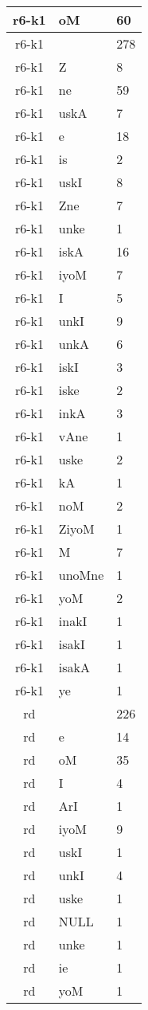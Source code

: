 \documentclass[a4 paper]{article}
\begin{document}
\begin{longtable}{cp{}p{}}
r6-k1 & oM & 60\\ \midrule r6-k1 &  & 278\\ \midrule r6-k1 & Z & 8\\ \midrule r6-k1 & ne & 59\\ \midrule r6-k1 & uskA & 7\\ \midrule r6-k1 & e & 18\\ \midrule r6-k1 & is & 2\\ \midrule r6-k1 & uskI & 8\\ \midrule r6-k1 & Zne & 7\\ \midrule r6-k1 & unke & 1\\ \midrule r6-k1 & iskA & 16\\ \midrule r6-k1 & iyoM & 7\\ \midrule r6-k1 & I & 5\\ \midrule r6-k1 & unkI & 9\\ \midrule r6-k1 & unkA & 6\\ \midrule r6-k1 & iskI & 3\\ \midrule r6-k1 & iske & 2\\ \midrule r6-k1 & inkA & 3\\ \midrule r6-k1 & vAne & 1\\ \midrule r6-k1 & uske & 2\\ \midrule r6-k1 & kA & 1\\ \midrule r6-k1 & noM & 2\\ \midrule r6-k1 & ZiyoM & 1\\ \midrule r6-k1 & M & 7\\ \midrule r6-k1 & unoMne & 1\\ \midrule r6-k1 & yoM & 2\\ \midrule r6-k1 & inakI & 1\\ \midrule r6-k1 & isakI & 1\\ \midrule r6-k1 & isakA & 1\\ \midrule r6-k1 & ye & 1\\ \midrule 
rd &  & 226\\ \midrule rd & e & 14\\ \midrule rd & oM & 35\\ \midrule rd & I & 4\\ \midrule rd & ArI & 1\\ \midrule rd & iyoM & 9\\ \midrule rd & uskI & 1\\ \midrule rd & unkI & 4\\ \midrule rd & uske & 1\\ \midrule rd & NULL & 1\\ \midrule rd & unke & 1\\ \midrule rd & ie & 1\\ \midrule rd & yoM & 1\\ \midrule 

\end{longtable}
\end{document}
